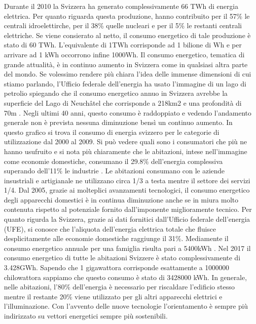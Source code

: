 Durante il 2010 la Svizzera ha generato complessivamente 66 TWh di energia elettrica. Per quanto riguarda questa produzione, hanno contribuito per il 57\% le centrali idroelettirche, per il 38\% quelle nucleari e per il 5\% le restanti centrali elettriche. Se viene consierato al netto, il consumo energetico di tale produzione è stato di 60 TWh. L’equivalente di 1TWh corrisponde ad 1 bilione di Wh e per arrivare ad 1 kWh occorrono infine 1000Wh. Il consumo energetico, tematica di grande attualità,  è in continuo aumento in Svizzera come in qualsiasi altra parte del mondo. Se volessimo rendere più chiara l’idea delle immense dimensioni di cui stiamo parlando, l’Ufficio federale dell’energia ha usato l’immagine di un lago di petrolio spiegando che il consumo energetico annuo in Svizzera avrebbe la superficie del Lago di Neuchâtel che corrisponde a 218km2 e una profondità di 70m . 
Negli ultimi 40 anni, questo consumo è raddoppiato e vedendo l’andamento generale non è prevista nessuna diminuzione bensì un continuo aumento.
In questo grafico si trova il consumo di energia svizzero per le categorie di utilizzazione dal 2000 al 2009. Si può vedere quali sono i consumatori che più ne hanno usufruito e si nota più chiaramente che le abitazioni, intese nell’immagine come economie domestiche, consumano il 29.8\% dell’energia complessiva superando dell’11\% le industrie .
Le abitazioni consumano con le aziende insustriali e artigianale ne utilizzano circa 1/3 a testa mentre il settore dei servizi 1/4.
Dal 2005, grazie ai molteplici avanzamenti tecnologici, il consumo energetico degli apparecchi domestici è in continua diminuzione anche se in miura molto contenuta rispetto al potenziale fornito dall’imponente miglioramente tecnico.
Per quanto rigurda la Svizzera, grazie ai dati fornitici dall’Ufficio federale dell’energia (UFE), si conosce che l’aliquota dell’energia elettrica totale che fluisce desplicitamente alle economie domestiche raggiunge il 31\%. 
Mediamente il consumo energetico annuale per una famiglia risulta pari a 5400kWh .
Nel 2017 il consumo energetico di tutte le abitazioni Svizzere è stato complessivamente di 3.428GWh. Sapendo che 1 gigawattora corrisponde esattamente a 1000000 chilowattora sappiamo che questo consumo è stato di 3428000 kWh.
In generale, nelle abitazioni, l’80\% dell’energia è necessario per riscaldare l’edificio stesso mentre il restante 20\% viene utilizzato per gli altri apparecchi elettrici e l’illuminazione. 
Con l’avvento delle nuove tecnologie l’orientamento è sempre più indirizzato su vettori energetici sempre più sostenibili.
